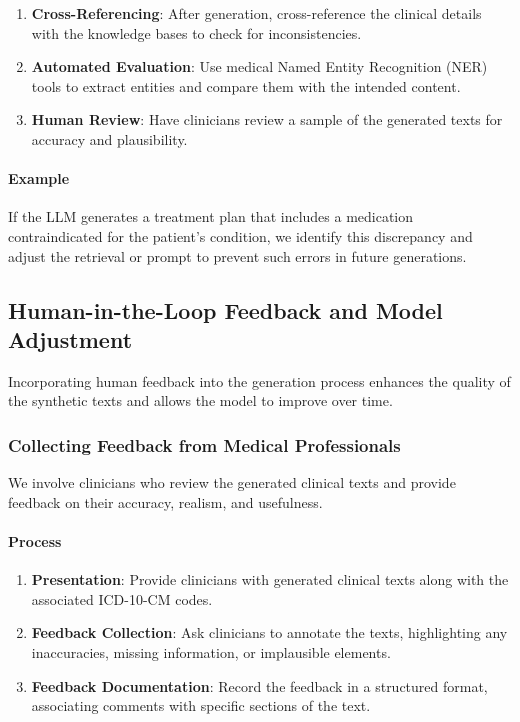 \documentclass[12pt, a4paper]{article}
\begin{document}
\begin{enumerate}
    \item \textbf{Cross-Referencing}: After generation, cross-reference the clinical details with the knowledge bases to check for inconsistencies.
    \item \textbf{Automated Evaluation}: Use medical Named Entity Recognition (NER) tools to extract entities and compare them with the intended content.
    \item \textbf{Human Review}: Have clinicians review a sample of the generated texts for accuracy and plausibility.
\end{enumerate}

\paragraph{Example}

If the LLM generates a treatment plan that includes a medication contraindicated for the patient's condition, we identify this discrepancy and adjust the retrieval or prompt to prevent such errors in future generations.

\subsection{Human-in-the-Loop Feedback and Model Adjustment}

Incorporating human feedback into the generation process enhances the quality of the synthetic texts and allows the model to improve over time.

\subsubsection{Collecting Feedback from Medical Professionals}

We involve clinicians who review the generated clinical texts and provide feedback on their accuracy, realism, and usefulness.

\paragraph{Process}

\begin{enumerate}
    \item \textbf{Presentation}: Provide clinicians with generated clinical texts along with the associated ICD-10-CM codes.
    \item \textbf{Feedback Collection}: Ask clinicians to annotate the texts, highlighting any inaccuracies, missing information, or implausible elements.
    \item \textbf{Feedback Documentation}: Record the feedback in a structured format, associating comments with specific sections of the text.
\end{enumerate}
\end{document}
